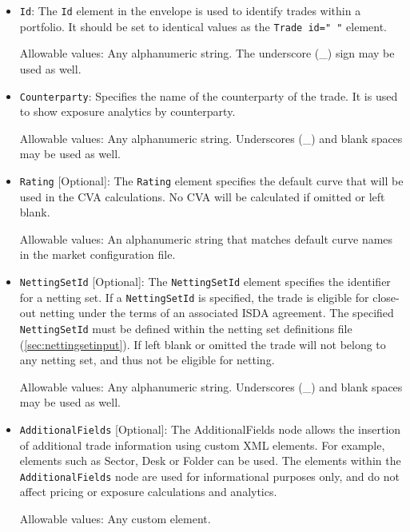 \begin{itemize}
\item {\tt Id}: The {\tt Id} element in the envelope is used to identify trades within a portfolio. It should be set to
  identical values as the {\tt Trade id=" "} element.

  Allowable values: Any alphanumeric string. The underscore (\_) sign may be used as well.

%

\item {\tt Counterparty}: Specifies the name of the counterparty of the trade.  It is used to show exposure analytics by
  counterparty.

Allowable values: Any alphanumeric string. Underscores (\_) and blank spaces may be used as well. 

\item {\tt Rating} [Optional]: The {\tt Rating} element specifies the default curve that will be used in the CVA
  calculations.  No CVA will be calculated if omitted or left blank.

Allowable values: An alphanumeric string that matches default curve names in the market configuration file.  

\item {\tt NettingSetId} [Optional]: The {\tt NettingSetId} element specifies the identifier for a netting set. If a
  \lstinline!NettingSetId! is specified, the trade is eligible for close-out netting under the terms of an associated
  ISDA agreement. The specified {\tt NettingSetId} must be defined within the netting set definitions file
  (\ref{sec:nettingsetinput}). If left blank or omitted the trade will not belong to any netting set, and thus not be
  eligible for netting.

Allowable values: Any alphanumeric string. Underscores (\_) and blank spaces may be used as well. 


\item \lstinline!AdditionalFields! [Optional]: The AdditionalFields node allows the insertion of additional trade
  information using custom XML elements.  For example, elements such as Sector, Desk or Folder can be used. The elements
  within the \lstinline!AdditionalFields! node are used for informational purposes only, and do not affect pricing or
  exposure calculations and analytics.

Allowable values: Any custom element.

\end{itemize}

